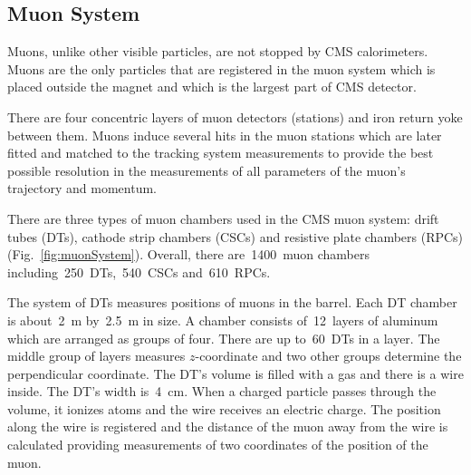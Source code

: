 \subsection{Muon System}

Muons, unlike other visible particles, are not stopped by CMS calorimeters. Muons are the only particles that are registered in the muon system which is placed outside the magnet and which is the largest part of CMS detector.

There are four concentric layers of muon detectors (stations) and iron return yoke between them. Muons induce several hits in the muon stations which are later fitted and matched to the tracking system measurements to provide the best possible resolution in the measurements of all parameters of the muon's trajectory and momentum.

There are three types of muon chambers used in the CMS muon system: drift tubes (DTs), cathode strip chambers (CSCs) and resistive plate chambers (RPCs) (Fig.~\ref{fig:muonSystem}). Overall, there are~1400~muon chambers including~250~DTs,~540~CSCs and~610~RPCs.

The system of DTs measures positions of muons in the barrel. Each DT chamber is about~2~m by~2.5~m in size. A chamber consists of~12~layers of aluminum which are arranged as groups of four. There are up to~60~DTs in a layer. The middle group of layers measures $z$-coordinate and two other groups determine the perpendicular coordinate. The DT's volume is filled with a gas and there is a wire inside. The DT's width is~4~cm. When a charged particle passes through the volume, it ionizes atoms and the wire receives an electric charge. The position along the wire is registered and the distance of the muon away from the wire is calculated providing measurements of two coordinates of the position of the muon.

